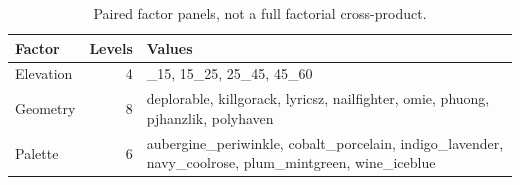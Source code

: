 \begingroup\small
\setlength{\tabcolsep}{4pt}
\begin{table}[htbp]\centering
\caption{Paired factor panels, not a full factorial cross-product.}\label{tab:design}
\begin{tabular}{>{\raggedright\arraybackslash}p{.16\linewidth}r>{\raggedright\arraybackslash}p{.65\linewidth}}
\toprule
Factor & %
Levels & %
Values \\ %
\midrule

Elevation & %
4 & %
08\_\allowbreak{}15, 15\_\allowbreak{}25, 25\_\allowbreak{}45, 45\_\allowbreak{}60 \\ %

Geometry & %
8 & %
deplorable, killgorack, lyricsz, nailfighter, omie, phuong, pjhanzlik, polyhaven \\ %

Palette & %
6 & %
aubergine\_\allowbreak{}periwinkle, cobalt\_\allowbreak{}porcelain, indigo\_\allowbreak{}lavender, navy\_\allowbreak{}coolrose, plum\_\allowbreak{}mintgreen, wine\_\allowbreak{}iceblue \\ %


\end{tabular}
\end{table}
